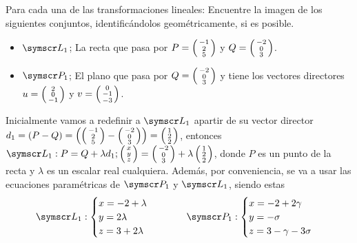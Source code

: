 \item Para cada una de las transformaciones lineales:
    Encuentre la imagen de los siguientes conjuntos, identificándolos geométricamente, si es posible.
    \begin{itemize}
        \item \(\fl_1\); La recta que pasa por \(P = \fsmvec{-1,2,5}\) y \(Q = \fsmvec{-2,0,3}\).
        \item \(\fp_1\); El plano que pasa por \(Q = \fsmvec{-2,0,3}\) y tiene los vectores directores \(u = \fsmvec{2,0,-1}\) y \(v = \fsmvec{0,-1,-3}\).
    \end{itemize}
    Inicialmente vamos a redefinir a \(\fl_1\) apartir de su vector director 
    \(d_1 = (P - Q) = \left(\fsmvec{-1,2,5} - \fsmvec{-2,0,3}\right) = \fsmvec{1,2,2}\),
    entonces \(\fl_1: P = Q + \lambda d_1; \fsmvec{x,y,z} = \fsmvec{-2,0,3} + \lambda \fsmvec{1,2,2}\), 
    donde \(P\) es un punto de la recta y \(\lambda\) es un escalar real cualquiera.
    Además, por conveniencia, se va a usar las ecuaciones paramétricas de \(\fp_1\) y \(\fl_1\), siendo estas
    \[
        \fl_1:
        \begin{cases}
            x = -2 + \lambda\\
            y = 2\lambda \\
            z = 3 + 2\lambda
        \end{cases}
        \hspace{1cm}
        \fp_1:
        \begin{cases}
            x = -2 + 2\gamma \\
            y = -\sigma \\
            z = 3 -\gamma -3\sigma
        \end{cases}
    \]

